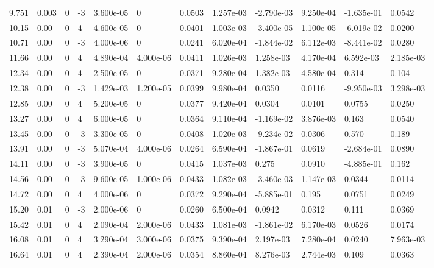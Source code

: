 \documentclass[preview]{standalone}
\begin{document}
{{\begin{tabular}{L{1.2cm}C{1.2cm} C{0.3cm}C{0.5cm} C{1.4cm}C{1.4cm} C{1.4cm}C{1.4cm} C{1.6cm}C{1.6cm} C{1.6cm}C{1.6cm}}
  9.751  &  0.003  & 0     & -3 &  3.600e-05  & 0  &  0.0503&   1.257e-03& -2.790e-03 & 9.250e-04   &  -1.635e-01 & 0.0542  \\ 
  10.15  &  0.00  & 0     &  4 &  4.600e-05  & 0  &  0.0401&   1.003e-03& -3.400e-05 & 1.100e-05   &  -6.019e-02 & 0.0200  \\ 
  10.71  &  0.00  & 0     & -3 &  4.000e-06  & 0  &  0.0241&   6.020e-04& -1.844e-02 & 6.112e-03   &  -8.441e-02 & 0.0280  \\ 
  11.66  &  0.00  & 0     &  4 &  4.890e-04  & 4.000e-06  &  0.0411&   1.026e-03& 1.258e-03 & 4.170e-04   &  6.592e-03 & 2.185e-03  \\ 
  12.34  &  0.00  & 0     &  4 &  2.500e-05  & 0  &  0.0371&   9.280e-04& 1.382e-03 & 4.580e-04   &  0.314 & 0.104  \\ 
  12.38  &  0.00  & 0     & -3 &  1.429e-03  & 1.200e-05  &  0.0399&   9.980e-04& 0.0350 & 0.0116   &  -9.950e-03 & 3.298e-03  \\ 
  12.85  &  0.00  & 0     &  4 &  5.200e-05  & 0  &  0.0377&   9.420e-04& 0.0304 & 0.0101   &  0.0755 & 0.0250  \\ 
  13.27  &  0.00  & 0     &  4 &  6.000e-05  & 0  &  0.0364&   9.110e-04& -1.169e-02 & 3.876e-03   &  0.163 & 0.0540  \\ 
  13.45  &  0.00  & 0     & -3 &  3.300e-05  & 0  &  0.0408&   1.020e-03& -9.234e-02 & 0.0306   &  0.570 & 0.189  \\ 
  13.91  &  0.00  & 0     & -3 &  5.070e-04  & 4.000e-06  &  0.0264&   6.590e-04& -1.867e-01 & 0.0619   &  -2.684e-01 & 0.0890  \\ 
  14.11  &  0.00  & 0     & -3 &  3.900e-05  & 0  &  0.0415&   1.037e-03& 0.275 & 0.0910   &  -4.885e-01 & 0.162  \\ 
  14.56  &  0.00  & 0     & -3 &  9.600e-05  & 1.000e-06  &  0.0433&   1.082e-03& -3.460e-03 & 1.147e-03   &  0.0344 & 0.0114  \\ 
  14.72  &  0.00  & 0     &  4 &  4.000e-06  & 0  &  0.0372&   9.290e-04& -5.885e-01 & 0.195   &  0.0751 & 0.0249  \\ 
  15.20  &  0.01  & 0     & -3 &  2.000e-06  & 0  &  0.0260&   6.500e-04& 0.0942 & 0.0312   &  0.111 & 0.0369  \\ 
  15.42  &  0.01  & 0     &  4 &  2.090e-04  & 2.000e-06  &  0.0433&   1.081e-03& -1.861e-02 & 6.170e-03   &  0.0526 & 0.0174  \\ 
  16.08  &  0.01  & 0     &  4 &  3.290e-04  & 3.000e-06  &  0.0375&   9.390e-04& 2.197e-03 & 7.280e-04   &  0.0240 & 7.963e-03  \\ 
  16.64  &  0.01  & 0     &  4 &  2.390e-04  & 2.000e-06  &  0.0354&   8.860e-04& 8.276e-03 & 2.744e-03   &  0.109 & 0.0363  \\ 
\hline 
\end{tabular} 

}}
\end{document}
